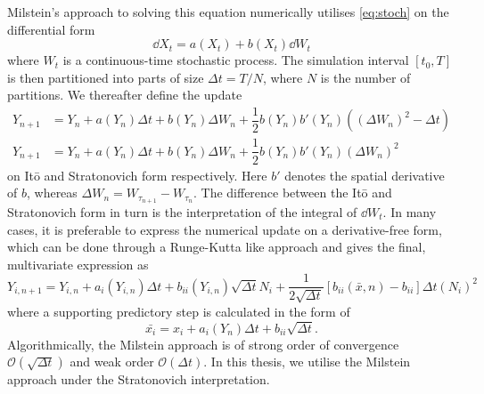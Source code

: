 Milstein's approach to solving this equation numerically utilises
\cref{eq:stoch} on the differential form 
\begin{equation}
  \dd X_t = a(X_t) + b(X_t) \dd W_t
  \label{eq:milstein_form}
\end{equation}
where $W_t$ is a continuous-time stochastic process. The simulation interval
$\left[ t_0, T \right]$is then partitioned into parts of size $\Delta t = T /
N$, where $N$ is the number of partitions. We thereafter define the update
\begin{align}
  Y_{n+1} &= Y_n + 
  a(Y_n)\Delta t + 
  b(Y_n)\Delta W_n +
  \dfrac{1}{2}b(Y_n)b'(Y_n)\left( \left( \Delta W_n \right)^2 - \Delta t \right) \\
  Y_{n+1} &= Y_n + 
  a(Y_n)\Delta t + 
  b(Y_n)\Delta W_n + 
  \dfrac{1}{2} b(Y_n)b'(Y_n) \left(\Delta W_n\right)^2 
  \label{eq:milstein_deriv}
\end{align}
on It\={o} and Stratonovich form respectively. Here $b'$ denotes the spatial
derivative of $b$, whereas $\Delta W_n = W_{\tau_{n+1}} - W_{\tau_n}$. The
difference between the It\={o} and Stratonovich form in turn is the
interpretation of the integral of $\dd W_t$. \CITE In many cases, it is
preferable to express the numerical update on a derivative-free form, which can
be done through a Runge-Kutta like approach \CITE and gives the final,
multivariate expression as 
\begin{equation}
  Y_{i, n+1} = Y_{i, n} + a_i\left( Y_{i,n} \right) \Delta t + 
  b_{ii}(Y_{i,n}) \sqrt{\Delta t} N_i + \dfrac{1}{2\sqrt{\Delta t}} \left[
    b_{ii}(\bar x, n) - b_{ii} \right]
  \Delta t (N_i)^2 
  \label{eq:milstein_deriv_free}
\end{equation}
where a supporting predictory step is calculated in the form of 
\begin{equation}
  \bar {x_i} = x_i + a_i\left( Y_n \right)\Delta t + b_{ii}\sqrt {\Delta t}.
  \label{eq:milstein_predictor}
\end{equation}
Algorithmically, the Milstein approach is of strong order of convergence
$\mathcal O \left( \sqrt{\Delta t }\right)$ and weak order $\mathcal O \left(
  \Delta t \right)$. In this thesis, we utilise the Milstein approach under the
Stratonovich interpretation.


% 

